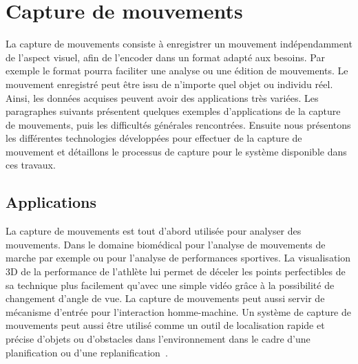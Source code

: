 \section{Capture de mouvements}
\label{chap:mocap}
La capture de mouvements consiste à enregistrer un mouvement indépendamment 
de l'aspect visuel, afin de l'encoder dans un format adapté aux besoins.
Par exemple le format pourra faciliter une analyse ou une édition de mouvements.
Le mouvement enregistré peut être issu de n'importe quel objet ou individu réel.
Ainsi, les données acquises peuvent avoir des applications très variées.
Les paragraphes suivants présentent quelques exemples d'applications de la capture de mouvements,
puis les difficultés générales rencontrées. 
Ensuite nous présentons les différentes technologies 
développées pour effectuer de la capture de mouvement et détaillons le 
processus de capture pour le système disponible dans ces travaux.

\subsection{Applications}
La capture de mouvements est tout d'abord utilisée pour analyser 
des mouvements. Dans le domaine biomédical pour l'analyse de mouvements de marche par exemple ou
pour l'analyse de performances sportives. La visualisation 3D
de la performance de l'athlète lui permet de déceler les points perfectibles de
sa technique plus facilement qu'avec une simple vidéo gr\^ace à la possibilité 
de changement d'angle de vue. La capture de mouvements peut aussi
servir de mécanisme d'entrée pour l'interaction homme-machine.
Un système de capture de mouvements peut aussi être utilisé comme un outil
de localisation rapide et précise d'objets ou d'obstacles dans l'environnement dans le
cadre d'une planification ou d'une replanification~\cite{baudouin11, stilman05}. 

